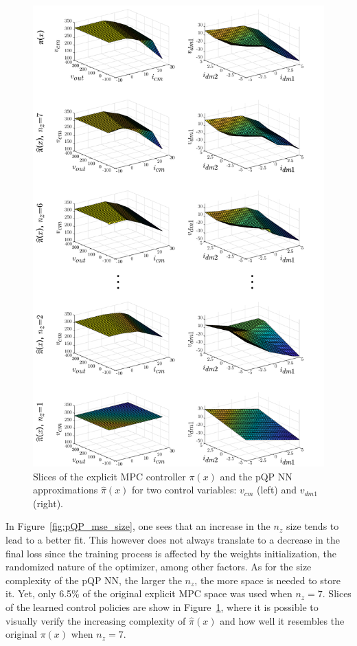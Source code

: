 \begin{figure}[!b]
	\vspace{0pt}
	\begin{center}
		\includegraphics[scale=0.65]{../images/chap4_simres_surfs.pdf}    %
		\caption{Slices of the explicit MPC controller $\pi(x)$ and the pQP NN approximations $\hat\pi(x)$ for two control variables: $v_{cm}$ (left) and $v_{dm1}$ (right).} 
		\label{fig:niceSlices}
	\end{center}
\end{figure}

In Figure~\ref{fig:pQP_mse_size}, one sees that an increase in the $n_z$ size tends to lead to a better fit. This however does not always translate to a decrease in the final loss since the training process is affected by the weights initialization, the randomized nature of the optimizer, among other factors. As for the size complexity of the pQP NN, the larger the $n_z$, the more space is needed to store it. Yet, only 6.5\% of the original explicit MPC space was used when $n_z=7$. Slices of the learned control policies are show in Figure~\ref{fig:niceSlices}, where it is possible to visually verify the increasing complexity of $\hat\pi(x)$ and how well it resembles the original $\pi(x)$ when $n_z = 7$.

